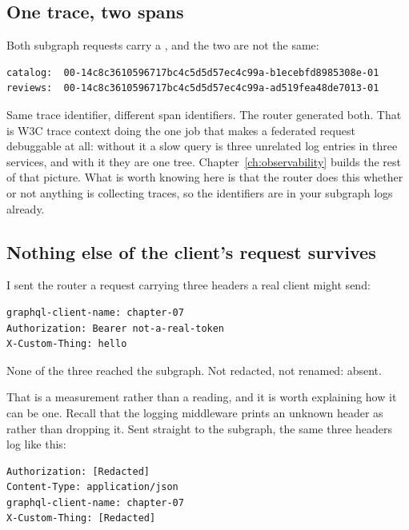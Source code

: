 \subsection*{One trace, two spans}

Both subgraph requests carry a , and the two are not the same:

\begin{verbatim}
catalog:  00-14c8c3610596717bc4c5d5d57ec4c99a-b1ecebfd8985308e-01
reviews:  00-14c8c3610596717bc4c5d5d57ec4c99a-ad519fea48de7013-01
\end{verbatim}

%
Same trace identifier, different span identifiers. The router generated both.
That is W3C trace context doing the one job that makes a federated request
debuggable at all: without it a slow query is three unrelated log entries in
three services, and with it they are one tree.
Chapter~\ref{ch:observability} builds the rest of that picture. What is worth
knowing here is that the router does this whether or not anything is collecting
traces, so the identifiers are in your subgraph logs already.

\subsection*{Nothing else of the client's request survives}

I sent the router a request carrying three headers a real client might send:

\begin{verbatim}
graphql-client-name: chapter-07
Authorization: Bearer not-a-real-token
X-Custom-Thing: hello
\end{verbatim}

None of the three reached the subgraph. Not redacted, not renamed: absent.

%
That is a measurement rather than a reading, and it is worth explaining how it
can be one. Recall that the logging middleware prints an unknown header as
\code{[Redacted]} rather than dropping it. Sent straight to the subgraph, the
same three headers log like this:

\begin{verbatim}
Authorization: [Redacted]
Content-Type: application/json
graphql-client-name: chapter-07
X-Custom-Thing: [Redacted]
\end{verbatim}

